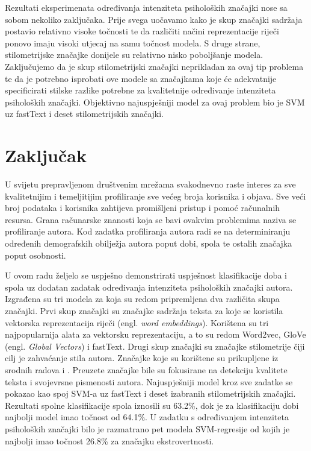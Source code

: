 \documentclass[times, utf8, zavrsni]{fer}
\begin{document}
Rezultati eksperimenata određivanja intenziteta psiholoških značajki nose sa sobom nekoliko zaključaka. Prije svega uočavamo kako je skup značajki sadržaja postavio relativno visoke točnosti te da različiti načini reprezentacije riječi ponovo imaju visoki utjecaj na samu točnost modela. S druge strane, stilometrijske značajke donijele su relativno nisko poboljšanje modela. Zaključujemo da je skup stilometrijski značajki neprikladan za ovaj tip problema te da je potrebno isprobati ove modele sa značajkama koje će adekvatnije specificirati stilske razlike potrebne za kvalitetnije određivanje intenziteta psiholoških značajki. Objektivno najuspješniji model za ovaj problem bio je SVM uz fastText i deset stilometrijskih značajki.



\chapter{Zaključak}

U svijetu prepravljenom društvenim mrežama svakodnevno raste interes za sve kvalitetnijim i temeljitijim profiliranje sve većeg broja korisnika i objava. Sve veći broj podataka i korisnika zahtijeva promišljeni pristup i pomoć računalnih resursa. Grana računarske znanosti koja se bavi ovakvim problemima naziva se profiliranje autora. Kod zadatka profiliranja autora radi se na determiniranju određenih demografskih obilježja autora poput dobi, spola te ostalih značajka poput osobnosti.

U ovom radu željelo se uspješno demonstrirati uspješnost klasifikacije doba i spola uz dodatan zadatak određivanja intenziteta  psiholoških značajki autora. Izgrađena su tri modela za koja su redom pripremljena dva različita skupa značajki. Prvi skup značajki su značajke sadržaja teksta za koje se koristila vektorska reprezentacija riječi (engl. \textit{word embeddings}). Korištena su tri najpopularnija alata za vektorsku reprezentaciju, a to su redom Word2vec, GloVe (engl. \textit{Global Vectors}) i fastText. Drugi skup značajki su značajke stilometrije čiji cilj je zahvaćanje stila autora. Značajke koje su korištene su prikupljene iz srodnih radova \citep{rangel2013} i \citep{rangle2015}. Preuzete značajke bile su fokusirane na detekciju kvalitete teksta i svojevrsne pismenosti autora. Najuspješniji model kroz sve zadatke se pokazao kao spoj SVM-a uz fastText i deset izabranih stilometrijskih značajki. Rezultati spolne klasifikacije spola iznosili su 63.2\%, dok je za klasifikaciju dobi najbolji model imao točnost od 64.1\%. U zadatku s određivanjem intenziteta psiholoških značajki bilo je razmatrano pet modela SVM-regresije od kojih je najbolji imao točnost 26.8\% za značajku ekstrovertnosti.  
\end{document}
